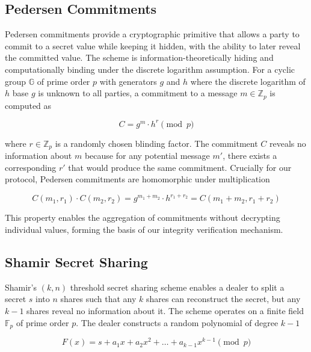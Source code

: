 \documentclass[conference]{IEEEtran}
\begin{document}
\subsection{Pedersen Commitments}

Pedersen commitments \cite{pedersen1991non} provide a cryptographic primitive that allows a party to commit to a secret value while keeping it hidden, with the ability to later reveal the committed value. The scheme is information-theoretically hiding and computationally binding under the discrete logarithm assumption. For a cyclic group $\mathbb{G}$ of prime order $p$ with generators $g$ and $h$ where the discrete logarithm of $h$ base $g$ is unknown to all parties, a commitment to a message $m \in \mathbb{Z}_p$ is computed as

\begin{equation}
C = g^{m} \cdot h^{r} \pmod{p}
\end{equation}

where $r \in \mathbb{Z}_p$ is a randomly chosen blinding factor. The commitment $C$ reveals no information about $m$ because for any potential message $m'$, there exists a corresponding $r'$ that would produce the same commitment. Crucially for our protocol, Pedersen commitments are homomorphic under multiplication

\begin{equation}
C(m_1, r_1) \cdot C(m_2, r_2) = g^{m_1+m_2} \cdot h^{r_1+r_2} = C(m_1 + m_2, r_1 + r_2)
\end{equation}

This property enables the aggregation of commitments without decrypting individual values, forming the basis of our integrity verification mechanism.

\subsection{Shamir Secret Sharing}

Shamir's \((k,n)\) threshold secret sharing scheme \cite{shamir1979how} enables a dealer to split a secret $s$ into $n$ shares such that any $k$ shares can reconstruct the secret, but any $k-1$ shares reveal no information about it. The scheme operates on a finite field $\mathbb{F}_p$ of prime order $p$. The dealer constructs a random polynomial of degree $k-1$

\begin{equation}
F(x) = s + a_1x + a_2x^2 + \ldots + a_{k-1}x^{k-1} \pmod{p}
\end{equation}
\end{document}

